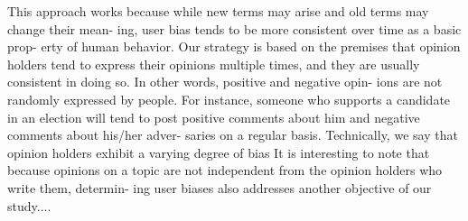 \documentclass[runningheads,a4paper]{llncs}
\begin{document}
This approach works because while new terms may arise and old terms may change their mean- ing, user bias tends to be more consistent over time as a basic prop- erty of human behavior. Our strategy is based on the premises that opinion holders tend to express their opinions multiple times, and they are usually consistent in doing so. In other words, positive and negative opin- ions are not randomly expressed by people. For instance, someone who supports a candidate in an election will tend to post positive comments about him and negative comments about his/her adver- saries on a regular basis. Technically, we say that opinion holders exhibit a varying degree of bias It is interesting to note that because opinions on a topic are not independent from the opinion holders who write them, determin- ing user biases also addresses another objective of our study....\cite{calais2011bias}
\end{document}
